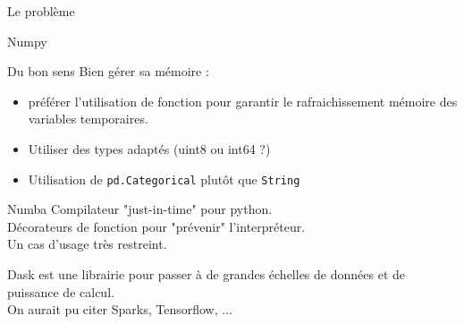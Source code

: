 \begin{frame}{Le problème}
\end{frame}

\begin{frame}{Numpy}
\end{frame}

\begin{frame}{Du bon sens}
  Bien gérer sa mémoire :
  \begin{itemize}
    \item préférer l'utilisation de fonction pour garantir le rafraichissement mémoire des variables temporaires.
    \item Utiliser des types adaptés (uint8 ou int64 ?)
    \item Utilisation de \texttt{pd.Categorical} plutôt que \texttt{String}
  \end{itemize}
\end{frame}

\begin{frame}{Numba}
  Compilateur "just-in-time" pour python. \\
  Décorateurs de fonction pour "prévenir" l'interpréteur. \\
  Un cas d'usage très restreint. \\
\end{frame}

\begin{frame}{Dask}
   est une librairie pour passer à de grandes échelles de données et de puissance de calcul. \\
  On aurait pu citer Sparks, Tensorflow, ...
\end{frame}
